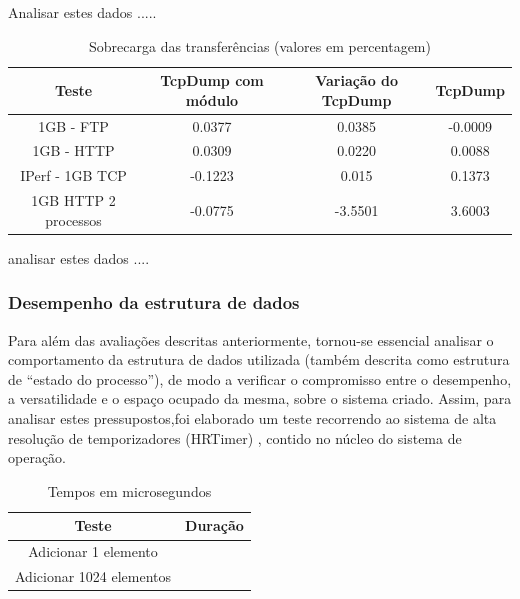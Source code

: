 \documentclass[a4paper]{llncs}
\begin{document}
Analisar estes dados .....

\begin{table}
\begin{center}

\begin{tabular}{ | c | c | c | c | }
\hline
Teste & TcpDump com módulo & Variação do TcpDump & \hspace {0.3cm} TcpDump \hspace {0.3cm}\\

\hline
1GB - FTP  & 0.0377 & 0.0385 & -0.0009 \\
1GB - HTTP &  0.0309 & 0.0220 & 0.0088 \\
IPerf - 1GB TCP &  -0.1223 & 0.015 & 0.1373 \\
\hline
\hline
1GB HTTP 2 processos & -0.0775 & -3.5501 & 3.6003 \\
\hline
\end{tabular}
\caption{Sobrecarga das transferências (valores em percentagem)}
\label{tab:overhead}
\end{center}
\end{table}


analisar estes dados ....

\subsubsection{Desempenho da estrutura de dados}
Para além das avaliações descritas anteriormente, tornou-se essencial analisar o comportamento da estrutura de dados utilizada (também descrita como estrutura de “estado do processo”), de modo a verificar o compromisso entre o desempenho, a versatilidade e o espaço ocupado da mesma, sobre o sistema criado. Assim, para analisar estes pressupostos,foi elaborado um teste recorrendo ao sistema de alta resolução de temporizadores (HRTimer) \cite{hrtimerKernel}, contido no núcleo do sistema de operação.

\begin{table}
\begin{center}

\begin{tabular}{ | c | c |  }
\hline
Teste & \hspace{1cm}Duração\hspace{1cm} \\
\hline
Adicionar 1 elemento & \\
\hline
Adicionar 1024 elementos & \\
\hline

\hline
\end{tabular}
\caption{Tempos em microsegundos}
\label{tab:tree_info}
\end{center}
\end{table}
\end{document}
